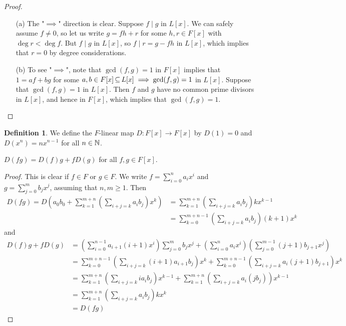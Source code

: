 \documentclass[11pt]{book}
\theoremstyle{definition}   \newtheorem{defn}[counter]{Definition} %
\DeclareMathOperator{\ra}{\rightarrow}   \DeclareMathOperator{\Poly}{\mathbf{P}}   \DeclareMathOperator{\spn}{\textnormal{span}}   \DeclareMathOperator{\aut}{\textnormal{Aut}}
\newcommand{\vs}{\vspace{8pt}}
\numberwithin{counter}{chapter}
\begin{document}
 \begin{proof}\ 
 \begin{enumerate}
 \item[(a)] The "$\implies$" direction is clear. Suppose $f \mid g$ in $L[x]$. We can safely assume $f \ne 0$, so let us write $g = fh + r$ for some $h,r \in F[x]$ with $\deg r < \deg f$. But $f \mid g$ in $L[x]$, so $f \mid r = g-fh$ in $L[x]$, which implies that $r = 0$ by degree considerations. 
 
 \item[(b)] To see "$\implies$", note that $\gcd(f,g) = 1$ in $F[x]$ implies that $1 = af + bg$ for some $a,b \in F[x] \operatorname{\subseteq} L[x] \implies \gcd(f,g) = 1$ in $L[x]$. Suppose that $\gcd(f,g) = 1$ in $L[x]$. Then $f$ and $g$ have no common prime divisors in $L[x]$, and hence in $F[x]$, which implies that $\gcd(f,g) = 1$. 
 \end{enumerate}
 \end{proof}
 
 \vs
 
 \begin{defn}
 We define the $F$-linear map $D : F[x] \ra F[x]$ by $D(1) = 0$ and $D(x^n) = n x^{n-1}$ for all $n \in \operatorname{\mathbb{N}}$. 
 \end{defn}

\vs

\begin{lemma}
$D(fg) = D(f)g + fD(g)$ for all $f,g \in F[x]$. 
\end{lemma}

\begin{proof}
This is clear if $f \in F$ or $g \in F$. We write $f = \sum_{i=0}^n a_i x^i$ and $g = \sum_{j=0}^m b_j x^j$, assuming that $n,m \geq 1$. Then
\begin{align*}
D(fg) = D\left(a_0 b_0 + \sum_{k=1}^{m+n} \left( \sum_{i+j=k} a_i b_j\right) x^k\right) &= \sum_{k=1}^{m+n} \left( \sum_{i+j=k} a_i b_j\right) k x^{k-1} \\
&= \sum_{k=0}^{m+n-1} \left(\sum_{i+j=k} a_i b_j\right) (k+1) x^k
\end{align*}
and
\begin{align*}
D(f)g + fD(g) &= \left(\sum_{i=0}^{n-1} a_{i+1}(i+1) x^{i}\right) \sum_{j=0}^m b_j x^j + \left(\sum_{i=0}^n a_i x^i\right) \left(\sum_{j=0}^{m-1} (j+1) b_{j+1}x^j\right) \\
&= \sum_{k=0}^{m+n-1} \left(\sum_{i+j=k} (i+1)a_{i+1} b_j\right)x^k + \sum_{k=0}^{m+n-1} \left(\sum_{i+j=k} a_i (j+1) b_{j+1}\right)x^k \\
&= \sum_{k=1}^{m+n} \left(\sum_{i+j=k} ia_{i} b_j\right)x^{k-1} + \sum_{k=1}^{m+n} \left(\sum_{i+j=k} a_i (j b_{j})\right)x^{k-1} \tag{critical step} \\
&= \sum_{k=1}^{m+n} \left(\sum_{i+j=k} a_i b_j \right) k x^k \\
&= D(fg) 
\end{align*}
\end{proof}
\end{document}
